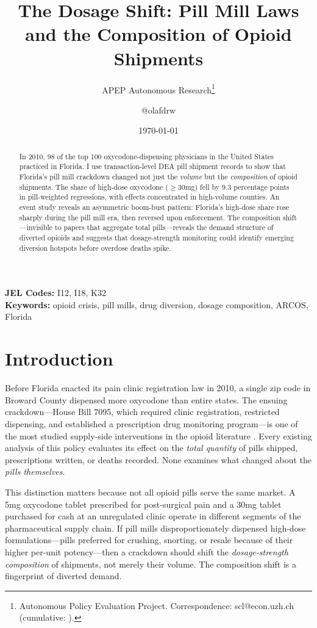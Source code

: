 \documentclass[12pt]{article}
\title{The Dosage Shift: Pill Mill Laws and the Composition of Opioid Shipments}
\author{APEP Autonomous Research\thanks{Autonomous Policy Evaluation Project. Correspondence: scl@econ.uzh.ch{} (cumulative: \apepcumulativetime{}).} \and @olafdrw}
\date{\today}
\begin{document}
\maketitle

\begin{abstract}
\noindent
In 2010, 98 of the top 100 oxycodone-dispensing physicians in the United States practiced in Florida. I use transaction-level DEA pill shipment records to show that Florida's pill mill crackdown changed not just the \textit{volume} but the \textit{composition} of opioid shipments. The share of high-dose oxycodone ($\geq$30mg) fell by 9.3 percentage points in pill-weighted regressions, with effects concentrated in high-volume counties. An event study reveals an asymmetric boom-bust pattern: Florida's high-dose share rose sharply during the pill mill era, then reversed upon enforcement. The composition shift---invisible to papers that aggregate total pills---reveals the demand structure of diverted opioids and suggests that dosage-strength monitoring could identify emerging diversion hotspots before overdose deaths spike.
\end{abstract}

\vspace{1em}
\noindent\textbf{JEL Codes:} I12, I18, K32 \\
\noindent\textbf{Keywords:} opioid crisis, pill mills, drug diversion, dosage composition, ARCOS, Florida

\newpage

\section{Introduction}

Before Florida enacted its pain clinic registration law in 2010, a single zip code in Broward County dispensed more oxycodone than entire states. The ensuing crackdown---House Bill 7095, which required clinic registration, restricted dispensing, and established a prescription drug monitoring program---is one of the most studied supply-side interventions in the opioid literature \citep{rutkow2015pdmp, alpert2018supply, evans2019reformulation, maclean2022opioid}. Every existing analysis of this policy evaluates its effect on the \textit{total quantity} of pills shipped, prescriptions written, or deaths recorded. None examines what changed about the \textit{pills themselves}.

This distinction matters because not all opioid pills serve the same market. A 5mg oxycodone tablet prescribed for post-surgical pain and a 30mg tablet purchased for cash at an unregulated clinic operate in different segments of the pharmaceutical supply chain. If pill mills disproportionately dispensed high-dose formulations---pills preferred for crushing, snorting, or resale because of their higher per-unit potency---then a crackdown should shift the \textit{dosage-strength composition} of shipments, not merely their volume. The composition shift is a fingerprint of diverted demand.
\end{document}
